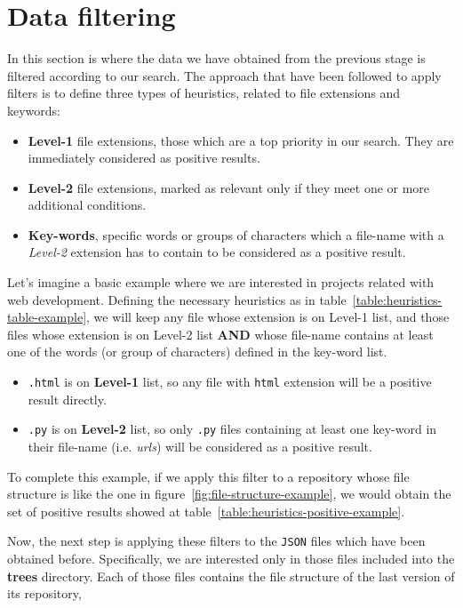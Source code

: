 \documentclass[a4paper, 12pt]{book}
\begin{document}
\section{Data filtering}
\label{sec:data-filtering}
In this section is where the data we have obtained from the previous stage is filtered according to our search.
The approach that have been followed to apply filters is to define three types of heuristics, related to
file extensions and keywords:
\begin{itemize}
  \item \textbf{Level-1} file extensions, those which are a top priority in our search. They are immediately considered
   as positive results.
  \item \textbf{Level-2} file extensions, marked as relevant only if they meet one or more additional conditions.
  \item \textbf{Key-words}, specific words or groups of characters which a file-name with a \textit{Level-2} extension
  has to contain to be considered as a positive result.
\end{itemize}
Let's imagine a basic example where we are interested in projects related with web development. Defining the
necessary heuristics as in table~\ref{table:heuristics-table-example}, we will keep any file whose extension
is on Level-1 list, and those files whose extension is on Level-2 list \textbf{AND} whose file-name contains at least one
of the words (or group of characters) defined in the key-word list.\\
\begin{itemize}
  \item \texttt{.html} is on \textbf{Level-1} list, so any file with \texttt{html} extension will be a positive result directly.
  \item \texttt{.py} is on \textbf{Level-2} list, so only \texttt{.py} files containing at least one key-word in their file-name
  (i.e. \textit{urls}) will be considered as a positive result.
\end{itemize}
To complete this example, if we apply this filter to a repository whose file structure is like the one in figure~\ref{fig:file-structure-example},
we would obtain the set of positive results showed at table~\ref{table:heuristics-positive-example}.\par
Now, the next step is applying these filters to the \texttt{JSON} files which have been obtained before.
Specifically, we are interested only in those files included into the \textbf{trees} directory.
Each of those files contains the file structure of the last version of its repository,
\end{document}
